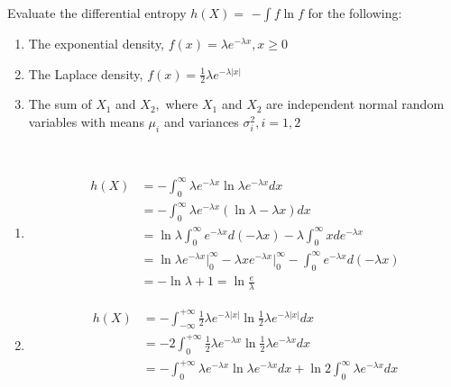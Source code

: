 \begin{exercise}{Evaluate the differential entropy $h(X)=$ $-\int f \ln f$ for the following:
  \begin{enumerate}
    \item The exponential density, $f(x)=\lambda e^{-\lambda x}, x \geq 0$
    \item The Laplace density, $f(x)=\frac{1}{2} \lambda e^{-\lambda|x|}$
    \item The sum of $X_{1}$ and $X_{2},$ where $X_{1}$ and $X_{2}$ are  independent normal random variables with means $\mu_{i}$ and variances $\sigma_{i}^{2}, i= 1,2$
  \end{enumerate}}
  \begin{solution}
  \par{~}
  \begin{enumerate}
    \item \begin{equation}
      \begin{aligned}
        h(X) &= -\int _{0}^{\infty} \lambda e^{-\lambda x} \ln \lambda e^{-\lambda x} dx\\
        &= -\int _{0}^{\infty} \lambda e^{-\lambda x} (\ln \lambda  - \lambda x) dx\\
        &= \ln \lambda \int _{0}^{\infty} e^{-\lambda x}   d (- \lambda x) -  \lambda  \int _{0}^{\infty} x  d  e^{-\lambda x} \\
        &= \ln \lambda e^{-\lambda x}  \bigg| _{0} ^{\infty} - \lambda x e^{-\lambda x} \bigg| _{0} ^{\infty} - \int_{0}^{\infty} e^{-\lambda x} d (-\lambda x) \\
        &= - \ln \lambda + 1 = \ln \frac{e}{\lambda}
      \end{aligned}
    \end{equation}
    \item \begin{equation}
      \begin{aligned}
        h(X) &= - \int_{-\infty}^{+\infty} \frac{1}{2} \lambda e^{-\lambda |x|} \ln \frac{1}{2} \lambda e^{-\lambda |x|} dx \\
        &= - 2 \int_{0}^{+\infty} \frac{1}{2}\lambda e^{-\lambda x} \ln \frac{1}{2}\lambda e^{-\lambda x}  dx \\
        &= - \int_{0}^{+\infty} \lambda e^{-\lambda x} \ln \lambda e^{-\lambda x} dx +  \ln 2 \int_{0}^{\infty} \lambda e^{-\lambda x} dx \\

\end{aligned}
\end{equation}
\end{enumerate}
\end{solution}
\end{exercise}
